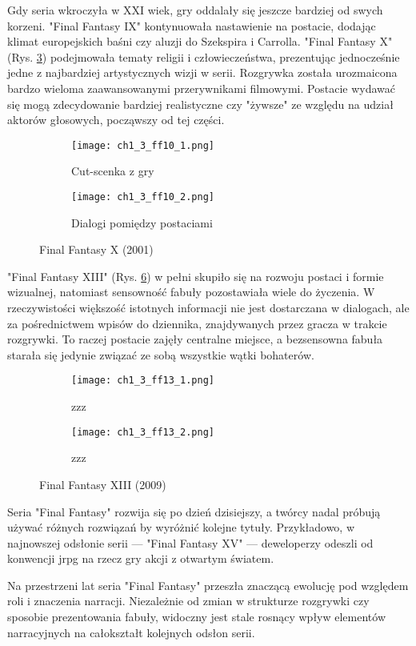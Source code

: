 \newpage

Gdy seria wkroczyła w XXI wiek, gry oddalały się jeszcze bardziej od swych korzeni. "Final Fantasy
IX" kontynuowała nastawienie na postacie, dodając klimat europejskich baśni czy aluzji do Szekspira i
Carrolla. "Final Fantasy X" (Rys. \ref{fig:ch1_3_ff10}) podejmowała tematy religii i człowieczeństwa,
prezentując jednocześnie jedne z najbardziej artystycznych wizji w serii\cite{the_evolution_of_final_fantasy}.
Rozgrywka została urozmaicona bardzo wieloma zaawansowanymi przerywnikami filmowymi. Postacie wydawać się
mogą zdecydowanie bardziej realistyczne czy "żywsze" ze względu na udział aktorów głosowych, począwszy
od tej części.

\begin{figure}[h]
	\begin{subfigure}{0.49\textwidth}
		\caption{Cut-scenka z gry}
		\texttt{[image: ch1\_3\_ff10\_1.png]}
		\label{subfig:ch_1_3_ff10_1}
	\end{subfigure}
	\begin{subfigure}{0.49\textwidth}
		\caption{Dialogi pomiędzy postaciami}
		\texttt{[image: ch1\_3\_ff10\_2.png]}
		\label{subfig:ch_1_3_ff10_2}
	\end{subfigure}
	\caption{Final Fantasy X (2001)}
	\label{fig:ch1_3_ff10}
\end{figure}

\newpage

"Final Fantasy XIII" (Rys. \ref{fig:ch1_3_ff13}) w pełni skupiło się na rozwoju postaci i
formie wizualnej, natomiast sensowność fabuły pozostawiała wiele do życzenia. W rzeczywistości większość
istotnych informacji nie jest dostarczana w dialogach, ale za pośrednictwem wpisów do dziennika,
znajdywanych przez gracza w trakcie rozgrywki. To raczej postacie zajęły centralne miejsce, a
bezsensowna fabuła starała się jedynie związać ze sobą wszystkie wątki
bohaterów\cite{the_evolution_of_final_fantasy}.

\begin{figure}[h]
	\begin{subfigure}{0.49\textwidth}
		\caption{zzz}
		\texttt{[image: ch1\_3\_ff13\_1.png]}
		\label{subfig:ch_1_3_ff13_1}
	\end{subfigure}
	\begin{subfigure}{0.49\textwidth}
		\caption{zzz}
		\texttt{[image: ch1\_3\_ff13\_2.png]}
		\label{subfig:ch_1_3_ff13_2}
	\end{subfigure}
	\caption{Final Fantasy XIII (2009)}
	\label{fig:ch1_3_ff13}
\end{figure}

Seria "Final Fantasy" rozwija się po dzień dzisiejszy, a twórcy nadal próbują używać różnych rozwiązań by
wyróżnić kolejne tytuły. Przykładowo, w najnowszej odsłonie serii --- "Final Fantasy XV" --- deweloperzy
odeszli od konwencji \gls{jrpg} na rzecz gry akcji z otwartym światem.

Na przestrzeni lat seria "Final Fantasy" przeszła znaczącą ewolucję pod względem roli i znaczenia narracji.
Niezależnie od zmian w strukturze rozgrywki czy sposobie prezentowania fabuły, widoczny jest stale rosnący
wpływ elementów narracyjnych na całokształt kolejnych odsłon serii.